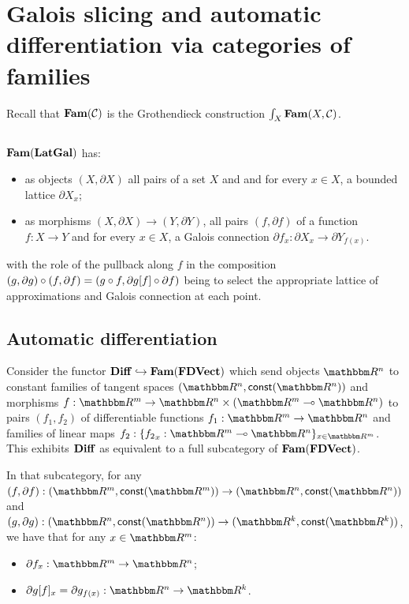 \section{Galois slicing and automatic differentiation via categories of families}
\label{sec:galois-slicing-auto-diff-via-fam}

Recall that $\mathbf{Fam}(\mathcal{C})$ is the Grothendieck construction $\int_{X}\mathbf{Fam}(X, \mathcal{C})$.

\subsection{\GPS}
\label{sec:galois-slicing-auto-diff-via-fam:galois-slicing}

$\mathbf{Fam}(\mathbf{LatGal})$ has:
\begin{itemize}
\item as objects $(X, \partial X)$ all pairs of a set $X$ and and for every $x \in X$, a bounded lattice
$\partial X_x$;
\item as morphisms $(X, \partial X) \to (Y, \partial Y)$, all pairs $(f, \partial f)$ of a function $f: X \to
Y$ and for every $x \in X$, a Galois connection $\partial f_x: \partial X_x \to \partial Y_{f(x)}$.
\end{itemize}

\noindent with the role of the pullback along $f$ in the composition $(g, \partial g) \circ (f, \partial f) =
(g \circ f, \partial g[f] \circ \partial f)$ being to select the appropriate lattice of
approximations and Galois connection at each point.

\subsection{Automatic differentiation}
\label{sec:galois-slicing-auto-diff-via-fam:auto-diff}

Consider the functor $\mathbf{Diff} \hookrightarrow \mathbf{Fam}(\mathbf{FDVect})$ which send objects $\RR^n$ to constant families of
tangent spaces $(\RR^n, \const(\RR^n))$ and morphisms $f: \RR^m \to \RR^n \times (\RR^m \linearto \RR^n)$ to
pairs $(f_1, f_2)$ of differentiable functions $f_1: \RR^m \to \RR^n$ and families of linear maps $f_2:
\{{f_2}_x: \RR^m \linearto \RR^n\}_{x \in \RR^m}$. This exhibits $\mathbf{Diff}$ as equivalent to a full subcategory
of $\mathbf{Fam}(\mathbf{FDVect})$.

In that subcategory, for any $(f, \partial f): (\RR^m, \const(\RR^m)) \to (\RR^n, \const(\RR^n))$ and $(g,
\partial g): (\RR^n, \const(\RR^n)) \to (\RR^k, \const(\RR^k))$, we have that for any $x \in \RR^m$:
\begin{itemize}
\item $\partial f_x: \RR^m \to \RR^n$;
\item $\reindex{\partial g}{f}_x = \partial g_{f(x)}: \RR^n \to \RR^k$.
\end{itemize}


